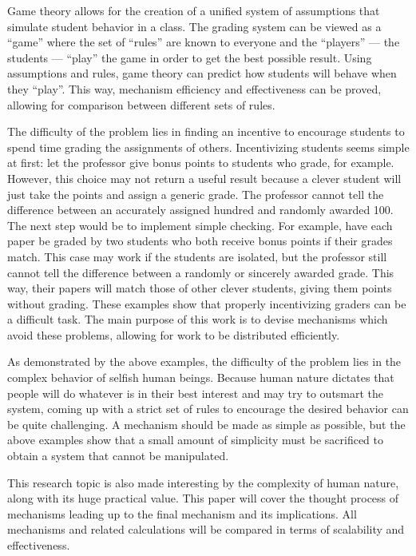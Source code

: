 \documentclass[12pt, Arial]{article}
\begin{document}
Game theory allows for the creation of a unified system of assumptions that simulate student behavior in a class. The grading system can be viewed as a ``game'' where the set of ``rules'' are known to everyone and the ``players'' --- the students --- ``play'' the game in order to get the best possible result. Using assumptions and rules, game theory can predict how students will behave when they ``play''. This way, mechanism efficiency and effectiveness can be proved, allowing for comparison between different sets of rules.

The difficulty of the problem lies in finding an incentive to encourage students to spend time grading the assignments of others. Incentivizing students seems simple at first: let the professor give bonus points to students who grade, for example. However, this choice may not return a useful result because a clever student will just take the points and assign a generic grade. The professor cannot tell the difference between an accurately assigned hundred and randomly awarded 100. The next step would be to implement simple checking. For example, have each paper be graded by two students who both receive bonus points if their grades match. This case may work if the students are isolated, but the professor still cannot tell the difference between a randomly or sincerely awarded grade. This way, their papers will match those of other clever students, giving them points without grading. These examples show that properly incentivizing graders can be a difficult task. The main purpose of this work is to devise mechanisms which avoid these problems, allowing for work to be distributed efficiently.

As demonstrated by the above examples, the difficulty of the problem lies in the complex behavior of selfish human beings. Because human nature dictates that people will do whatever is in their best interest and may try to outsmart the system, coming up with a strict set of rules to encourage the desired behavior can be quite challenging. A mechanism should be made as simple as possible, but the above examples show that a small amount of simplicity must be sacrificed to obtain a system that cannot be manipulated.

This research topic is also made interesting by the complexity of human nature, along with its huge practical value. This paper will cover the thought process of mechanisms leading up to the final mechanism and its implications. All mechanisms and related calculations will be compared in terms of scalability and effectiveness.
\end{document}
